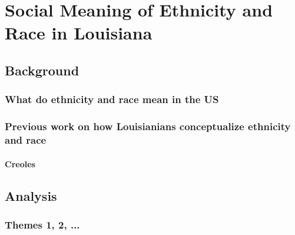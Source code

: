\chapter{Social Meaning of Ethnicity and Race in Louisiana}
  \section{Background}
    \subsection{What do ethnicity and race mean in the US}
    \subsection{Previous work on how Louisianians conceptualize ethnicity and race}
      \subsubsection{Creoles}
  \section{Analysis}
    \subsection{Themes 1, 2, ...}

